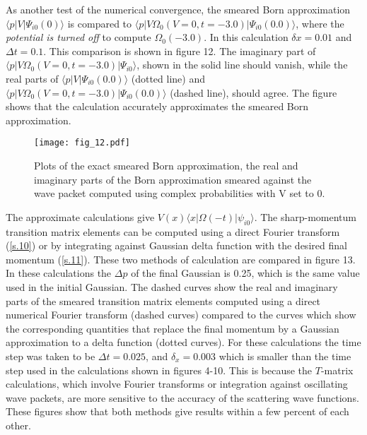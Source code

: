 \documentclass[aps,prc,reprint,noshowpacs,groupedaddress,onecolumn]{revtex4}
\begin{document}
As another test of the numerical convergence,  the smeared Born 
approximation $\langle p \vert V \vert \Psi_{i0}(0)\rangle$ is compared to 
$\langle p \vert V \Omega_0 (V=0,t=-3.0) \vert \Psi_{i0}(0.0)\rangle$, where
the {\it potential is turned off} to compute $\Omega_0(-3.0)$.  
In this calculation 
$\delta x= 0.01$ and $\Delta t =0.1$.  This comparison is shown in figure
12.  The imaginary part of $\langle p \vert V \Omega_0 (V=0,t=-3.0) \vert
\Psi_{i0}\rangle$, shown in the solid line should vanish, while the
real parts of 
$\langle p \vert V \vert \Psi_{i0}(0.0)\rangle$ (dotted line) and 
$\langle p \vert V \Omega_0 (V=0,t=-3.0) \vert \Psi_{i0}(0.0)\rangle$
(dashed line), should agree.  The figure shows that 
the calculation accurately approximates the smeared Born approximation.

\begin{figure}
\caption{Plots of the exact smeared Born approximation,
the real and imaginary parts of the Born approximation smeared
against the wave packet
computed using complex probabilities with V set to 0.} 
\centering
\texttt{[image: fig\_12.pdf]}
\label{figure 12}
\end{figure}  
The approximate calculations give
$V(x) \langle x \vert \Omega (-t) \vert \psi_{i0}\rangle$.  The
sharp-momentum transition matrix elements can be computed using a
direct Fourier transform (\ref{s.10}) or by integrating against
Gaussian delta function with the desired final momentum (\ref{s.11}).
These two methods of calculation are compared in figure 13.
In these calculations the $\Delta p$ of the final Gaussian is 0.25,
which is the same value used in the initial Gaussian.  The dashed
curves show the real and imaginary parts of the smeared transition
matrix elements computed using a direct numerical Fourier transform
(dashed curves) compared to the curves which show the corresponding
quantities that replace the final momentum by a Gaussian approximation
to a delta function (dotted curves).  For these calculations the time
step was taken to be $\Delta t =0.025$, and $\delta_x= 0.003$ which is
smaller than the time step used in the calculations shown in figures 4-10.
This is because the $T$-matrix calculations, which involve
Fourier transforms or integration against oscillating wave packets,
are more sensitive to the accuracy of the scattering wave functions.
These figures show that both methods give results within a few percent
of each other.
\end{document}

